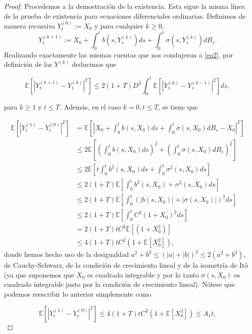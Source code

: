 \documentclass[letterpaper]{article}
\newcommand{\abs}[1]{\left\lvert #1 \right\rvert}
\newcommand{\E}{\mathbb{E}}
\newcommand{\1}{\mathds{1}}
\theoremstyle{definition}
\theoremstyle{definition}
\theoremstyle{definition}
\theoremstyle{definition}
\theoremstyle{definition}
\begin{document}
\begin{enumerate}
\begin{proof}
        Procedemos a la demostración de la existencia. Esta sigue la misma línea de la prueba de existencia para 
        ecuaciones diferenciales ordinarias. Definimos de manera recursiva $Y_t^{(0)}:=X_0$ y para 
        cualquier $k\geq0$, 
        \[
        Y_{t}^{(k+1)}:=X_0+\int_0^{t}b(s,Y_s^{(k)})ds+\int_0^t\sigma(s,Y_s^{(k)})dB_s.    
        \]
        Realizando exactamente las mismas cuentas que nos condujeron a \eqref{eq2}, por definición de las $Y^{(k)}$ deducimos que 
        
        \begin{equation}\label{eq4}
                \E\left[\abs{Y_t^{(k+1)}-Y_t^{(k)}}^2\right]\leq 2(1+T)D^2\int_0^{t} \E\left[\abs{Y_s^{(k)}-Y_s^{(k-1)}}^2\right]ds,
        \end{equation}
        
        para $k\geq1$ y $t\leq T$. Además, en el caso $k=0, t\leq T$, se tiene que 
        
        \begin{align*}
            \E\left[\abs{Y_t^{(1)}-Y_t^{(0)}}^2\right]&=\E\left[\abs{X_0+\int_0^{t}b(s,X_0)ds+\int_0^t\sigma(s,X_0)dB_s-X_0}^2\right]\\
            &\leq 2\E\left[\left(\int_0^{t}b(s,X_0)ds\right)^2+\left(\int_0^t\sigma(s,X_0)dB_s\right)^2\right]\\
            &\leq 2\E\left[t\int_0^{t}b^2(s,X_0)ds+\int_0^t\sigma^2(s,X_0)ds\right]\\
            &\leq 2(1+T)\E\left[\int_{0}^{t}b^2(s,X_0)+\sigma^2(s,X_0)ds\right]\\
            &\leq 2(1+T)\E\left[\int_{0}^{t}\left(|b(s,X_0)|+|\sigma(s,X_0)|\right)^2ds\right]\\
            &\leq 2(1+T)\E\left[\int_{0}^{t}C^2(1+X_0)^2ds\right]\\
            &=2(1+T)tC^2 \E\left[(1+X_0^2)\right]\\
            &\leq 4(1+T)tC^2(1+\E\left[X_0^2\right])\label{eq3},
        \end{align*}
        donde hemos hecho uso de la desigualdad $a^2+b^2\leq(|a|+|b|)^2\leq 2(a^2+b^2)$, de Cauchy-Schwarz, de la condición de crecimiento lineal y de la isometría de Itô (ya que suponemos 
        que $X_0$ es cuadrado integrable y por lo tanto $\sigma(s,X_0)$ es cuadrado integrable justo por la condición de crecimiento lineal). Nótese que podemos reescribir lo anterior simplemente como 
        
        \begin{equation}\label{eq6}
                \E\left[\abs{Y_t^{(1)}-Y_t^{(0)}}^2\right]\leq 4(1+T)tC^2(1+\E\left[X_0^2\right])\leq A_1t,
        \end{equation}
        

\end{proof}
\end{enumerate}
\end{document}
